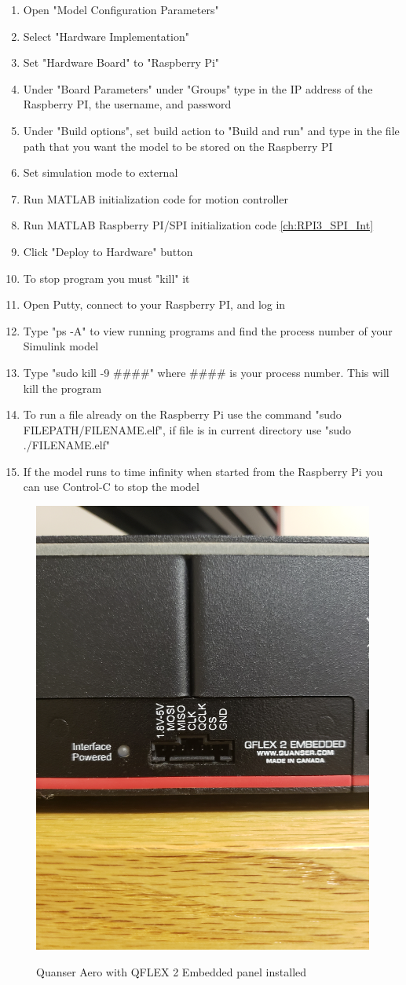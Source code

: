 \begin{enumerate}
    \item Open "Model Configuration Parameters"
    \item Select "Hardware Implementation"
    \item Set "Hardware Board" to "Raspberry Pi"
    \item Under "Board Parameters" under "Groups" type in the IP address of the Raspberry PI, the username, and password
    \item Under "Build options", set build action to "Build and run" and type in the file path that you want the model to be stored on the Raspberry PI
    \item Set simulation mode to external
    \item Run MATLAB initialization code for motion controller
    \item Run MATLAB Raspberry PI/SPI initialization code \ref{ch:RPI3_SPI_Int}
    \item Click "Deploy to Hardware" button
    \item To stop program you must "kill" it
    \item Open Putty, connect to your Raspberry PI, and log in
    \item Type "ps -A" to view running programs and find the process number of your Simulink model
    \item Type "sudo kill -9 \#\#\#\#" where \#\#\#\# is your process number.  This will kill the program
    \item To run a file already on the Raspberry Pi use the command "sudo FILEPATH/FILENAME.elf", if file is in current directory use "sudo ./FILENAME.elf"
    \item If the model runs to time infinity when started from the Raspberry Pi you can use Control-C to stop the model
\end{enumerate}

\begin{figure}[!h]
    \centering
    \includegraphics[angle = 270,width=.248\textwidth,keepaspectratio=true]{figs/img/Embedded_Panel.jpg}
    \label{fig:Embedded_Panel}
    \caption{Quanser Aero with QFLEX 2 Embedded panel installed}
\end{figure}
